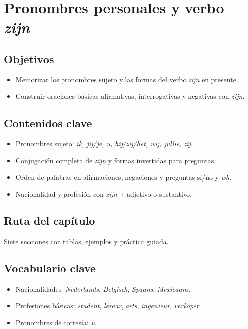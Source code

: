 \chapter{Pronombres personales y verbo \textit{zijn}}
\section{Objetivos}
\begin{itemize}[leftmargin=*]
	\item Memorizar los pronombres sujeto y las formas del verbo \textit{zijn} en presente.
	\item Construir oraciones básicas afirmativas, interrogativas y negativas con \textit{zijn}.
\end{itemize}

\section{Contenidos clave}
\begin{itemize}[leftmargin=*]
	\item Pronombres sujeto: \textit{ik, jij/je, u, hij/zij/het, wij, jullie, zij}.
	\item Conjugación completa de \textit{zijn} y formas invertidas para preguntas.
	\item Orden de palabras en afirmaciones, negaciones y preguntas sí/no y \textit{wh}.
	\item Nacionalidad y profesión con \textit{zijn} + adjetivo o sustantivo.
\end{itemize}

\section{Ruta del capítulo}
Siete secciones con tablas, ejemplos y práctica guiada.









\section{Vocabulario clave}
\begin{itemize}[leftmargin=*]
	\item Nacionalidades: \textit{Nederlands}, \textit{Belgisch}, \textit{Spaans}, \textit{Mexicaans}.
	\item Profesiones básicas: \textit{student}, \textit{leraar}, \textit{arts}, \textit{ingenieur}, \textit{verkoper}.
	\item Pronombres de cortesía: \textit{u}.
\end{itemize}


